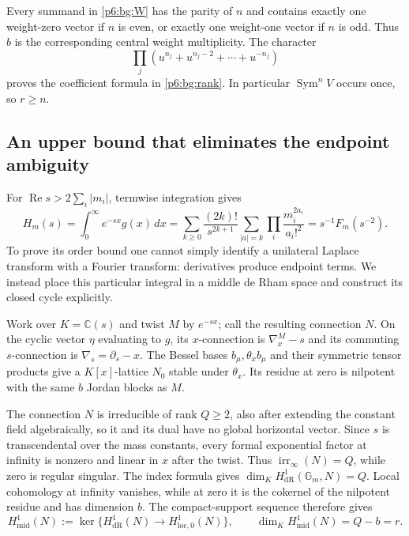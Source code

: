 \documentclass[11pt,a4paper]{article}
\theoremstyle{definition}
\theoremstyle{remark}
\numberwithin{equation}{section}
\begin{document}
Every summand in \eqref{p6:bg:W} has the parity of $n$ and contains
exactly one weight-zero vector if $n$ is even, or exactly one
weight-one vector if $n$ is odd.  Thus $b$ is the corresponding
central weight multiplicity.  The character
\[
 \prod_j(u^{n_j}+u^{n_j-2}+\cdots+u^{-n_j})
\]
proves the coefficient formula in \eqref{p6:bg:rank}.
In particular $\operatorname{Sym}^nV$ occurs once, so $r\ge n$.

\subsection{An upper bound that eliminates the endpoint ambiguity}

For $\operatorname{Re}s>2\sum_i|m_i|$, termwise integration gives
\begin{equation}\label{p6:bg:Laplace}
 H_m(s)=\int_0^\infty e^{-sx}g(x)\,dx
       =\sum_{k\ge0}\frac{(2k)!}{s^{2k+1}}
                   \sum_{|a|=k}\prod_i\frac{m_i^{2a_i}}{a_i!^2}
       =s^{-1}F_m(s^{-2}).
\end{equation}
To prove its order bound one cannot simply identify a unilateral
Laplace transform with a Fourier transform: derivatives produce
endpoint terms.  We instead place this particular integral in a
middle de Rham space and construct its closed cycle explicitly.

Work over $K=\mathbb C(s)$ and twist $M$ by $e^{-sx}$; call the
resulting connection $N$.  On the cyclic vector $\eta$ evaluating to
$g$, its $x$-connection is $\nabla_x^M-s$ and its commuting
$s$-connection is $\nabla_s=\partial_s-x$.  The Bessel bases
$b_\mu,\theta_xb_\mu$ and their symmetric tensor products give a
$K[x]$-lattice $N_0$ stable under $\theta_x$.  Its residue at zero
is nilpotent with the same $b$ Jordan blocks as $M$.

The connection $N$ is irreducible of rank $Q\ge2$, also after
extending the constant field algebraically, so it and its dual
have no global horizontal vector.  Since $s$ is transcendental
over the mass constants, every formal exponential factor at
infinity is nonzero and linear in $x$ after the twist.  Thus
$\operatorname{irr}_\infty(N)=Q$, while zero is regular singular.
The index formula gives $\dim_K H^1_{\mathrm{dR}}(\mathbb G_m,N)=Q$.
Local cohomology at infinity vanishes, while at zero it is the
cokernel of the nilpotent residue and has dimension $b$.
The compact-support sequence therefore gives
\begin{equation}\label{p6:bg:middle}
 H^1_{\mathrm{mid}}(N):=
 \ker\{H^1_{\mathrm{dR}}(N)\longrightarrow H^1_{\mathrm{loc},0}(N)\},
 \qquad \dim_K H^1_{\mathrm{mid}}(N)=Q-b=r.
\end{equation}
\end{document}
